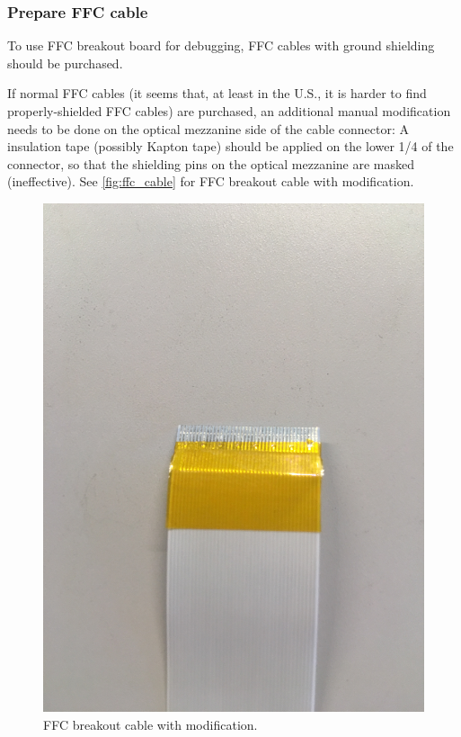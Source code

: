 \subsubsection{Prepare FFC cable}
To use FFC breakout board for debugging, FFC cables with ground shielding should
be purchased.

If normal FFC cables (it seems that, at least in the U.S., it is harder to find
properly-shielded FFC cables) are purchased, an additional manual modification
needs to be done on the optical mezzanine side of the cable connector:
A insulation tape (possibly Kapton tape) should be applied on the lower 1/4 of
the connector, so that the shielding pins on the optical mezzanine are masked
(ineffective).
See \autoref{fig:ffc_cable} for FFC breakout cable with modification.

\begin{figure}[!ht]
\centering
\includegraphics[width=0.9\linewidth]{res/ffc_breakout_cable_with_tape.jpg}
\caption{FFC breakout cable with modification.}
\label{fig:ffc_cable}
\end{figure}
